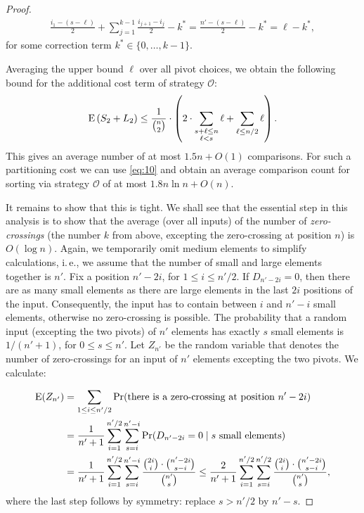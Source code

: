 \documentclass[prodmode,acmtalg]{acmsmall}
\newcommand{\E}{\textnormal{\textrm{E}}}
\begin{document}
\begin{proof}
    \begin{align}
        \frac{i_1 - (s - \ell)}{2} + \sum_{j = 1}^{k - 1} \frac{i_{j + 1} - i_j}{2} - k^\ast = \frac{n' - (s - \ell) }{2} - k^\ast = \ell - k^\ast,
        \label{eq:o:act}
    \end{align}
    for some correction term $k^\ast \in \{0,\ldots,k - 1\}$.

    Averaging the upper bound $\ell$ over all pivot choices, we obtain the following bound for the additional cost term of strategy $\mathcal{O}$:
    \begin{align}\label{eq:5000}
        \E\left(S_2 + L_2\right) \leq \frac{1}{\binom{n}{2}} \cdot \left( 2 \cdot \sum_{\substack{s + \ell \leq n \\\ell < s}} \ell + \sum_{\ell \leq n/2} \ell\right).
    \end{align}
    This gives an average number of at most $1.5n + O(1)$ comparisons. For such
    a
    partitioning cost we can use \eqref{eq:10} and obtain an 
    average comparison count for sorting via strategy $\mathcal{O}$ of at most $1.8 n\ln n + O(n)$.


    It remains to show that this is tight. We shall see that the essential step in this analysis
    is to show that the average (over all inputs) of the number of \emph{zero-crossings} 
    (the number $k$ from above, excepting the zero-crossing at position $n$)
    is $O(\log n)$. Again, we temporarily omit medium elements to simplify
    calculations, i.\,e., we assume that the number of small and large elements
    together is $n'$. Fix a position $n' - 2i$, for $1 \leq i \leq n'/2$. If $D_{n' - 2i} = 0$, 
    then there are as many small elements as there are large elements in the last $2i$ positions
    of the input. Consequently, the input has to contain between $i$ and $n' - i$ small elements, otherwise
    no zero-crossing is possible.
    The probability that a random input (excepting the two pivots) of $n'$ elements has exactly $s$ small elements is $1/(n' + 1)$, for $0 \leq s \leq n'$.
    Let $Z_{n'}$ be the random variable that denotes the number of
    zero-crossings for an input of $n'$ elements excepting the two pivots. We calculate:

\begin{align*}
    \E(Z_{n'}) &= \sum_{1 \leq i \leq n'/2} \Pr(\text{there is a zero-crossing at
position $n' - 2i$})\\
&= \frac{1}{n' + 1} \sum_{i = 1}^{n'/2} \sum_{s = i}^{n' - i} \Pr(D_{n' - 2i} = 0 \mid \text{$s$ small elements})\\
&= \frac{1}{n' + 1} \sum_{i = 1}^{n'/2} \sum_{s = i}^{n' - i}
\frac{\binom{2i}{i} \cdot \binom{n' - 2i}{s-i}}{\binom{n'}{s}}
\leq \frac{2}{n' + 1} \sum_{i = 1}^{n'/2} \sum_{s = i}^{n'/2}
\frac{\binom{2i}{i} \cdot \binom{n' - 2i}{s-i}}{\binom{n'}{s}},
\end{align*}
where the last step follows by symmetry: replace $s > n'/2$ by $n'-s$.


\end{proof}
\end{document}
